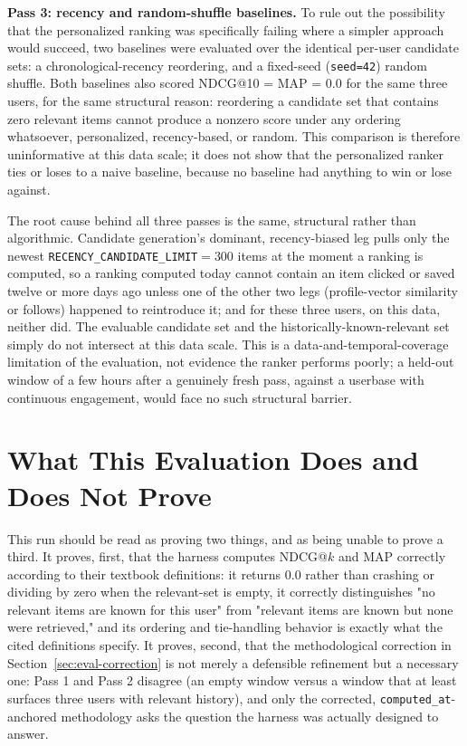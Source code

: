 \textbf{Pass 3: recency and random-shuffle baselines.} To rule out the possibility that the personalized ranking was specifically failing where a simpler approach would succeed, two baselines were evaluated over the identical per-user candidate sets: a chronological-recency reordering, and a fixed-seed (\texttt{seed=42}) random shuffle. Both baselines also scored NDCG@10 = MAP = $0.0$ for the same three users, for the same structural reason: reordering a candidate set that contains zero relevant items cannot produce a nonzero score under any ordering whatsoever, personalized, recency-based, or random. This comparison is therefore uninformative at this data scale; it does not show that the personalized ranker ties or loses to a naive baseline, because no baseline had anything to win or lose against.

The root cause behind all three passes is the same, structural rather than algorithmic. Candidate generation's dominant, recency-biased leg pulls only the newest \texttt{RECENCY\_CANDIDATE\_LIMIT}$=300$ items at the moment a ranking is computed, so a ranking computed today cannot contain an item clicked or saved twelve or more days ago unless one of the other two legs (profile-vector similarity or follows) happened to reintroduce it; and for these three users, on this data, neither did. The evaluable candidate set and the historically-known-relevant set simply do not intersect at this data scale. This is a data-and-temporal-coverage limitation of the evaluation, not evidence the ranker performs poorly; a held-out window of a few hours after a genuinely fresh pass, against a userbase with continuous engagement, would face no such structural barrier.

\section{What This Evaluation Does and Does Not Prove}
\label{sec:eval-scope}

This run should be read as proving two things, and as being unable to prove a third. It proves, first, that the harness computes NDCG@$k$ and MAP correctly according to their textbook definitions: it returns $0.0$ rather than crashing or dividing by zero when the relevant-set is empty, it correctly distinguishes "no relevant items are known for this user" from "relevant items are known but none were retrieved," and its ordering and tie-handling behavior is exactly what the cited definitions specify. It proves, second, that the methodological correction in Section~\ref{sec:eval-correction} is not merely a defensible refinement but a necessary one: Pass 1 and Pass 2 disagree (an empty window versus a window that at least surfaces three users with relevant history), and only the corrected, \texttt{computed\_at}-anchored methodology asks the question the harness was actually designed to answer.

